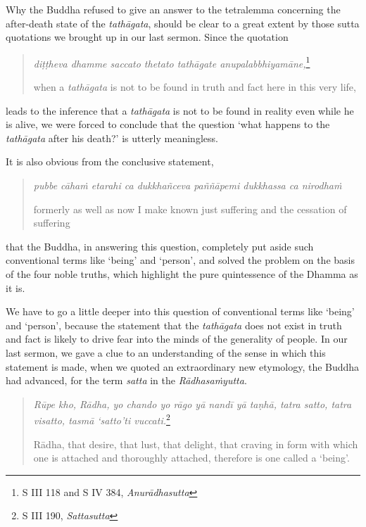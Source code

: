 Why the Buddha refused to give an answer to the tetralemma concerning the after-death state of the \emph{tathāgata}, should be clear to a great extent by those sutta quotations we brought up in our last sermon. Since the quotation

\begin{quote}
\emph{diṭṭheva dhamme saccato thetato tathāgate anupalabbhiyamāne,}\footnote{S III 118 and S IV 384, \emph{Anurādhasutta}}

when a \emph{tathāgata} is not to be found in truth and fact here in this very life,
\end{quote}

leads to the inference that a \emph{tathāgata} is not to be found in reality even while he is alive, we were forced to conclude that the question `what happens to the \emph{tathāgata} after his death?' is utterly meaningless.

It is also obvious from the conclusive statement,

\begin{quote}
\emph{pubbe cāhaṁ etarahi ca dukkhañceva paññāpemi dukkhassa ca nirodhaṁ}

formerly as well as now I make known just suffering and the cessation of suffering
\end{quote}

that the Buddha, in answering this question, completely put aside such conventional terms like `being' and `person', and solved the problem on the basis of the four noble truths, which highlight the pure quintessence of the Dhamma as it is.

We have to go a little deeper into this question of conventional terms like `being' and `person', because the statement that the \emph{tathāgata} does not exist in truth and fact is likely to drive fear into the minds of the generality of people. In our last sermon, we gave a clue to an understanding of the sense in which this statement is made, when we quoted an extraordinary new etymology, the Buddha had advanced, for the term \emph{satta} in the \emph{Rādhasaṁyutta}.

\begin{quote}
\emph{Rūpe kho, Rādha, yo chando yo rāgo yā nandī yā taṇhā, tatra satto, tatra visatto, tasmā `satto'ti vuccati.}\footnote{S III 190, \emph{Sattasutta}}

Rādha, that desire, that lust, that delight, that craving in form with which one is attached and thoroughly attached, therefore is one called a `being'.
\end{quote}

